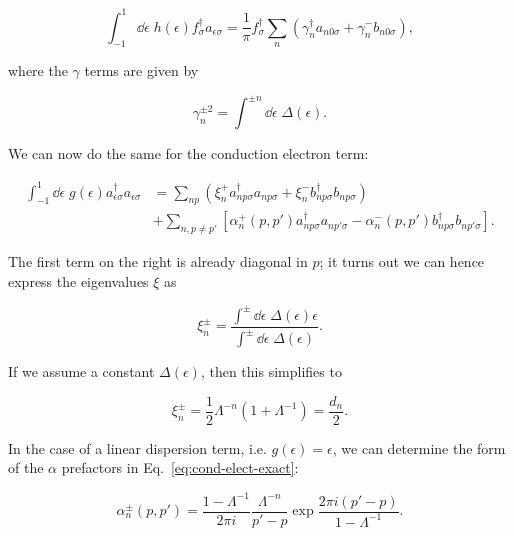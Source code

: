 \begin{equation}
  \int_{-1}^1\dd\epsilon \; h(\epsilon) f^\dagger_{\sigma}a_{\epsilon\sigma} = \frac{1}{\pi}f^\dagger_\sigma \sum_n \left( \gamma^\dagger_n a_{n0\sigma} + \gamma^-_n b_{n0\sigma} \right),
\end{equation}

where the $\gamma$ terms are given by

\begin{equation}
  \gamma^{\pm2}_n = \int^{\pm n}\dd\epsilon \; \Delta(\epsilon).
\end{equation}

We can now do the same for the conduction electron term:

\begin{align}
  \int_{-1}^1 \dd\epsilon \; g(\epsilon) a^\dagger_{\epsilon\sigma}a_{\epsilon\sigma} &= \sum_{np} \left( \xi^+_n a^\dagger_{np\sigma}a_{np\sigma} + \xi^-_n b^\dagger_{np\sigma}b_{np\sigma} \right) \\
                                                                                      &+ \sum_{n,p \neq p'}\left[ \alpha^+_n(p,p')a^\dagger_{np\sigma}a_{np'\sigma} - \alpha^-_n(p,p')b^\dagger_{np\sigma}b_{np'\sigma} \right].\label{eq:cond-elect-exact}
\end{align}

The first term on the right is already diagonal in $p$; it turns out we can hence express the eigenvalues $\xi$ as

\begin{equation}
  \xi^{\pm}_n = \frac{\int^{\pm }\dd\epsilon \; \Delta(\epsilon)\epsilon}{\int^{\pm }\dd\epsilon \; \Delta(\epsilon)}.\label{eq:xi-exact}
\end{equation}

If we assume a constant $\Delta(\epsilon)$, then this simplifies to

\begin{equation}
  \xi^{\pm}_n = \frac{1}{2}\Lambda^{-n}(1 + \Lambda^{-1}) = \frac{d_n}{2}.
\end{equation}

In the case of a linear dispersion term, i.e. $g(\epsilon) = \epsilon$, we can determine the form of the $\alpha$ prefactors in Eq.~\eqref{eq:cond-elect-exact}:

\begin{equation}
  \alpha^{\pm}_n(p,p') = \frac{1 - \Lambda^{-1}}{2\pi i}\frac{\Lambda^{-n}}{p'-p} \exp{\frac{2\pi i(p'-p)}{1 - \Lambda^{-1}}}.
\end{equation}

